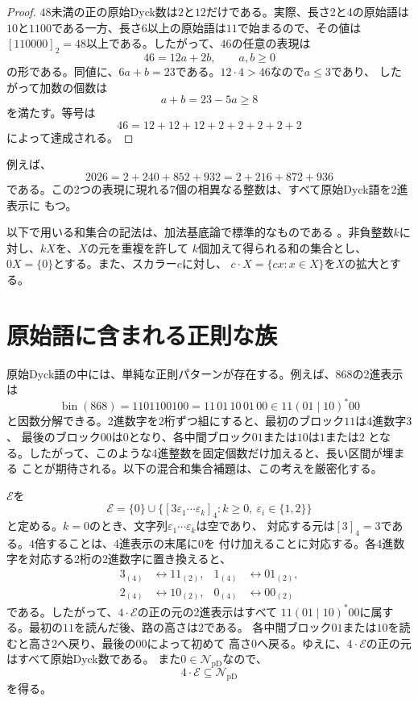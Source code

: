 \documentclass[12pt]{ltjsarticle}
\theoremstyle{plain}
\newcommand{\val}[2]{[#1]_{#2}}
\newcommand{\NpD}{\mathcal{N}_{\mathrm{pD}}}
\begin{document}
\begin{proof}
$48$未満の正の原始Dyck数は$2$と$12$だけである。実際、長さ2と4の原始語は
$10$と$1100$である一方、長さ6以上の原始語は$11$で始まるので、その値は
$[110000]_2=48$以上である。したがって、$46$の任意の表現は
\[
        46=12a+2b,\qquad a,b\geq0
\]
の形である。同値に、$6a+b=23$である。$12\cdot4>46$なので$a\leq3$であり、
したがって加数の個数は
\[
        a+b=23-5a\geq8
\]
を満たす。等号は
\[
        46=12+12+12+2+2+2+2+2
\]
によって達成される。
\end{proof}

例えば、
\[
 2026=2+240+852+932=2+216+872+936
\]
である。この2つの表現に現れる7個の相異なる整数は、すべて原始Dyck語を2進表示に
もつ。

以下で用いる和集合の記法は、加法基底論で標準的なものである
\cite[Chap.\ 1]{Nathanson}。非負整数$k$に対し、$kX$を、$X$の元を重複を許して
$k$個加えて得られる和の集合とし、$0X=\{0\}$とする。また、スカラー$c$に対し、
$c\cdot X=\{cx:x\in X\}$を$X$の拡大とする。

\section{原始語に含まれる正則な族}

原始Dyck語の中には、単純な正則パターンが存在する。例えば、$868$の2進表示は
\[
 \operatorname{bin}(868)=1101100100=11\,01\,10\,01\,00
 \in 11(01\mid10)^*00
\]
と因数分解できる。2進数字を2桁ずつ組にすると、最初のブロック$11$は4進数字$3$、
最後のブロック$00$は$0$となり、各中間ブロック$01$または$10$は$1$または$2$
となる。したがって、このような4進整数を固定個数だけ加えると、長い区間が埋まる
ことが期待される。以下の混合和集合補題は、この考えを厳密化する。

$\mathcal E$を
\[
 \mathcal E=\{0\}\cup
 \bigl\{\val{3\varepsilon_1\cdots\varepsilon_k}{4}:
        k\geq0,\ \varepsilon_i\in\{1,2\}\bigr\}
\]
と定める。$k=0$のとき、文字列$\varepsilon_1\cdots\varepsilon_k$は空であり、
対応する元は$\val{3}{4}=3$である。$4$倍することは、4進表示の末尾に$0$を
付け加えることに対応する。各4進数字を対応する2桁の2進数字に置き換えると、
\[
\begin{aligned}
 3_{(4)}&\longleftrightarrow11_{(2)},&
 1_{(4)}&\longleftrightarrow01_{(2)},\\
 2_{(4)}&\longleftrightarrow10_{(2)},&
 0_{(4)}&\longleftrightarrow00_{(2)}
\end{aligned}
\]
である。したがって、$4\cdot\mathcal E$の正の元の2進表示はすべて
$11(01\mid10)^*00$に属する。最初の$11$を読んだ後、路の高さは$2$である。
各中間ブロック$01$または$10$を読むと高さ$2$へ戻り、最後の$00$によって初めて
高さ$0$へ戻る。ゆえに、$4\cdot\mathcal E$の正の元はすべて原始Dyck数である。
また$0\in\NpD$なので、
\begin{equation}\label{eq:4E}
        4\cdot\mathcal E\subseteq\NpD
\end{equation}
を得る。
\end{document}
